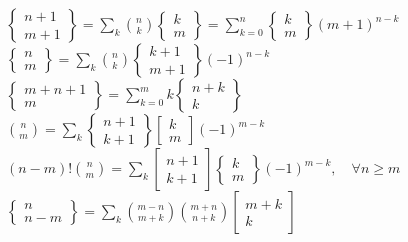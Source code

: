 ${\displaystyle \left\{\begin{matrix} n+1 \\ m+1 \end{matrix}\right\} = \sum_k {n \choose k} \left\{\begin{matrix} k \\ m \end{matrix}\right\} = \sum_{k=0}^n \left\{\begin{matrix} k \\ m \end{matrix}\right\} (m+1)^{n-k}}$\\
${\displaystyle \left\{\begin{matrix} n \\ m \end{matrix}\right\} = \sum_k {n \choose k} \left\{\begin{matrix} k+1 \\ m+1 \end{matrix}\right\} (-1)^{n-k}}$~~~~~~
${\displaystyle \left\{\begin{matrix} m+n+1 \\ m \end{matrix}\right\} = \sum_{k=0}^m k  \left\{\begin{matrix} n+k \\ k \end{matrix}\right\}}$\\
${\displaystyle {n \choose m} = \sum_k \left\{\begin{matrix} n+1 \\ k+1 \end{matrix}\right\} \left[\begin{matrix} k \\ m \end{matrix}\right] (-1)^{m-k}}$\\
${\displaystyle (n-m)!{n \choose m} = \sum_k \left[\begin{matrix} n+1 \\ k+1 \end{matrix}\right] \left\{\begin{matrix} k \\ m \end{matrix}\right\} (-1)^{m-k}, \quad \forall n \geq m}$\\
${\displaystyle \left\{\begin{matrix} n \\ n-m \end{matrix}\right\} = \sum_k {m-n \choose m+k} {m+n \choose n+k}\left[\begin{matrix} m+k \\ k \end{matrix}\right]}$\\
